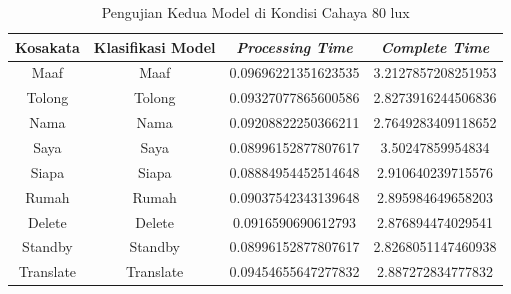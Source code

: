 \newpage
\begin{longtable}{|c|c|c|c|}
  \caption{Pengujian Kedua Model di Kondisi Cahaya 80 lux}
  \label{tb:prediksiremang2}                                   \\
  \hline
  \rowcolor[HTML]{C0C0C0}
  \textbf{Kosakata} & \textbf{Klasifikasi Model} & \textbf{\emph{Processing Time}} & \textbf{\emph{Complete Time}}\\
  \hline
  Maaf              & Maaf                        & 0.09696221351623535                           & 3.2127857208251953                                  \\
  Tolong            & Tolong                        & 0.09327077865600586                           & 2.8273916244506836                                  \\
  Nama              & Nama                        & 0.09208822250366211                           & 2.7649283409118652                                  \\
  Saya              & Saya                        & 0.08996152877807617                           & 3.50247859954834                                  \\
  Siapa              & Siapa                        & 0.08884954452514648                          & 2.910640239715576                                  \\
  Rumah             & Rumah                       & 0.09037542343139648                           & 2.895984649658203                                  \\
  Delete            & Delete                       & 0.0916590690612793                            & 2.876894474029541                                  \\
  Standby           & Standby                      & 0.08996152877807617                           & 2.8268051147460938                                  \\
  Translate         & Translate                     & 0.09454655647277832                           & 2.887272834777832                                  \\
  \hline
\end{longtable}

